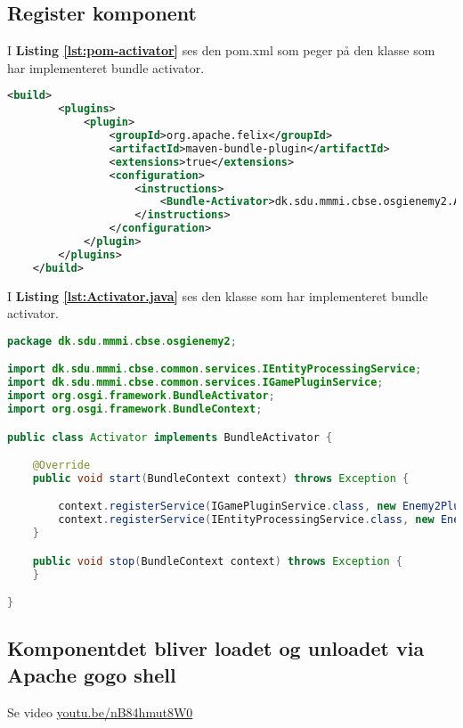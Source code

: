 \hfill \linebreak \hline 
{}
\hline \hfill \linebreak

\subsection{Register komponent}

I \textbf{Listing \ref{lst:pom-activator}} ses den pom.xml som peger på den
klasse som har implementeret bundle activator.

\begin{lstlisting}[caption={pom.xml}, label={lst:pom-activator}, language=xml]
    <build>
        <plugins>
            <plugin>
                <groupId>org.apache.felix</groupId>
                <artifactId>maven-bundle-plugin</artifactId>
                <extensions>true</extensions>
                <configuration>
                    <instructions>
                        <Bundle-Activator>dk.sdu.mmmi.cbse.osgienemy2.Activator</Bundle-Activator>
                    </instructions>
                </configuration>
            </plugin>
        </plugins>
    </build>
\end{lstlisting}


I \textbf{Listing \ref{lst:Activator.java}} ses den klasse som har implementeret
bundle activator.

\begin{lstlisting}[caption={Activator.java}, label={lst:Activator.java}, language=java]
package dk.sdu.mmmi.cbse.osgienemy2;

import dk.sdu.mmmi.cbse.common.services.IEntityProcessingService;
import dk.sdu.mmmi.cbse.common.services.IGamePluginService;
import org.osgi.framework.BundleActivator;
import org.osgi.framework.BundleContext;

public class Activator implements BundleActivator {

    @Override
    public void start(BundleContext context) throws Exception {

        context.registerService(IGamePluginService.class, new Enemy2Plugin(), null);
        context.registerService(IEntityProcessingService.class, new Enemy2Processor(), null);
    }

    public void stop(BundleContext context) throws Exception {
    }

}
\end{lstlisting}





\subsection{Komponentdet bliver loadet og unloadet via Apache gogo shell}
Se video \href{https://www.youtube.com/watch?v=nB84hmut8W0}{youtu.be/nB84hmut8W0}

